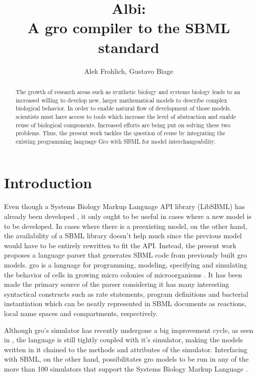 \documentclass[12pt]{article}
\title{Albi:\\ A gro compiler to the SBML standard}
\author{Alek Frohlich\inst{1}, Gustavo Biage\inst{1}}
\begin{document}
\maketitle

\begin{abstract}
    The growth of research areas such as synthetic biology and systems biology leads to an increased willing to develop new, larger mathematical models to describe complex biological behavior. In order to enable natural flow of development of those models, scientists must have access to tools which increase the level of abstraction and enable reuse of biological components. Increased efforts are being put on solving these two problems. Thus, the present work tackles the question of reuse by integrating the existing programming language Gro with SBML for model interchangeability.
\end{abstract}

\section{Introduction}

    Even though a Systems Biology Markup Language API library (LibSBML) has already been developed \cite{Bornstein2008}, it only ought to be useful in cases where a new model is to be developed. In cases where there is a preexisting model, on the other hand, the availability of a SBML library doesn't help much since the previous model would have to be entirely rewritten to fit the API. Instead, the present work proposes a language parser that generates SBML code from previously built gro models. gro is a language for programming, modeling, specifying and simulating the behavior of cells in growing micro colonies of microorganisms \cite{Jang2012}. It has been made the primary source of the parser considering it has many interesting syntactical constructs such as rate statements, program definitions and bacterial instantiation which can be neatly represented in SBML documents as reactions, local name spaces and compartments, respectively.
    
    Although gro's simulator has recently undergone a big improvement cycle, as seen in \cite{Gutirrez2017}, the language is still tightly coupled with it's simulator, making the models written in it chained to the methods and attributes of the simulator. Interfacing with SBML, on the other hand, possibilitates gro models to be run in any of the more than 100 simulators that support the Systems Biology Markup Language \cite{Hucka2007}.
    
\end{document}
